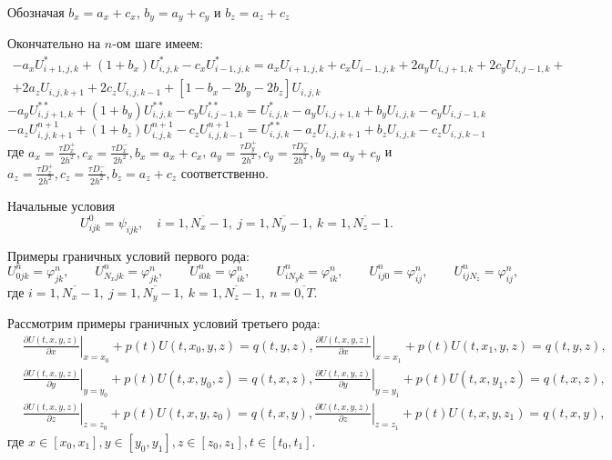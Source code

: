 \documentclass[a4paper,12pt]{article}
\begin{document}
Обозначая $b_x = a_x + c_x$, $b_y = a_y + c_y$ и $b_z = a_z + c_z$

Окончательно на $n$-ом шаге имеем:
\begin{multline}
  \label{eq:3d-scheme}
  - a_x U^{*}_{i+1,j,k} + \left( 1 + b_x \right) U^{*}_{i,j,k} - c_x U^{*}_{i-1,j,k}
  = a_x U_{i+1,j,k} + c_x U_{i-1,j,k} + 2a_y U_{i,j+1,k}  + 2c_y U_{i,j-1,k} + \\ + 2a_z U_{i,j,k+1} + 2c_z U_{i,j,k-1}
  + \left[ 1 - b_x - 2b_y - 2b_z \right] U_{i,j,k}
\end{multline}
\begin{equation*}
  - a_y U^{**}_{i,j+1,k} + \left( 1  + b_y \right) U^{**}_{i,j,k} - c_y U^{**}_{i,j-1,k} =
  U^{*}_{i,j,k} - a_y U_{i,j+1,k} + b_y U_{i,j,k} - c_y U_{i,j-1,k}
\end{equation*}
\begin{equation*}
  - a_z U^{n+1}_{i,j,k+1} + \left( 1 + b_z \right) U^{n+1}_{i,j,k} - c_z U^{n+1}_{i,j,k-1} =  U^{**}_{i,j,k} - a_z U_{i,j,k+1}  + b_z U_{i,j,k} - c_z U_{i,j,k-1}
\end{equation*}
где $a_x = \frac{\tau D^+_x}{2h^2}, c_x = \frac{\tau D^-_x}{2h^2}, b_x = a_x + c_x$, $a_y = \frac{\tau D^+_y}{2h^2}, c_y = \frac{\tau D^-_y}{2h^2}, b_y = a_y + c_y$ и $a_z = \frac{\tau D^+_z}{2h^2}, c_z = \frac{\tau D^-_z}{2h^2}, b_z = a_z + c_z$ соответственно.

Начальные условия
\begin{equation}
  \label{eq:3d-ic}
  U^0_{ijk} = \psi_{ijk}, \quad i = \overline {1, N_x-1}, \ j = \overline {1, N_y-1}, \ k = \overline {1, N_z-1}.
\end{equation}

Примеры граничных условий первого рода:
\begin{equation*}
  \label{eq:3d-bc1}
  U^n_{0jk} = \varphi_{jk}^n, \qquad U^n_{N_x j k} = \varphi_{jk}^n, \qquad  U^n_{i0k} = \varphi_{ik}^n, \qquad U^n_{i N_y k} = \varphi_{ik}^n, \qquad  U^n_{ij0} = \varphi_{ij}^n, \qquad U^n_{i j N_z} = \varphi_{ij}^n,
\end{equation*}
где $i = \overline {1, N_x-1}, \ j = \overline {1, N_y-1}, \ k = \overline {1, N_z-1}, \ n = \overline{0,T}$.

Рассмотрим примеры граничных условий третьего рода:
\begin{align*}
  &\left. \frac{ \partial U(t,x,y,z) }{\partial x} \right|_{x = x_0} +
    p(t) U(t, x_0, y, z) = q(t, y, z),
    \left. \frac{ \partial U(t,x,y,z) }{\partial x} \right|_{x = x_1} +
    p(t) U(t, x_1, y, z) = q(t, y, z), \\
  &\left. \frac{ \partial U(t,x,y,z) }{\partial y} \right|_{y = y_0} +
    p(t) U(t, x, y_0,z)= q(t, x,z),
    \left. \frac{ \partial U(t,x,y,z) }{\partial y} \right|_{y = y_1} +
    p(t) U(t, x, y_1,z)= q(t, x,z),  \\
  &\left. \frac{ \partial U(t,x,y,z) }{\partial z} \right|_{z = z_0} +
    p(t) U(t, x, y, z_0)= q(t, x, y),
    \left. \frac{ \partial U(t,x,y,z) }{\partial z} \right|_{z = z_1} +
    p(t) U(t, x, y, z_1)= q(t, x, y),
\end{align*}
где $x \in [x_0, x_1], y \in [y_0,y_1], z \in [z_0,z_1], t \in [t_0, t_1]$.
\end{document}
